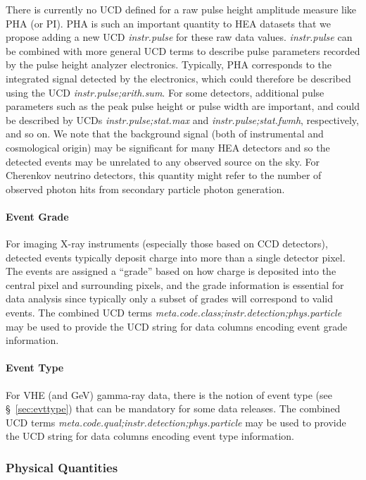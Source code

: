 \documentclass[11pt,a4paper]{ivoa}
\begin{document}
There is currently no UCD defined for a raw pulse height amplitude measure like PHA (or PI). PHA is such an important quantity to \gls{HEA} datasets that we propose adding a new UCD {\em instr.pulse\/} for these raw data values. {\em instr.pulse\/} can be combined with more general UCD terms to describe pulse parameters recorded by the pulse height analyzer electronics. Typically, PHA corresponds to the integrated signal detected by the electronics, which could therefore be described using the UCD {\em instr.pulse;arith.sum}. For some detectors, additional pulse parameters such as the peak pulse height or pulse width are important, and could be described by UCDs {\em instr.pulse;stat.max} and {\em instr.pulse;stat.fwmh}, respectively, and so on. We note that the background signal (both of instrumental and cosmological origin) may be significant for many \gls{HEA} detectors and so the detected events may be unrelated to any observed source on the sky. For Cherenkov neutrino detectors, this quantity might refer to the number of observed photon hits from secondary particle photon generation.

\paragraph{Event Grade}

For imaging X-ray instruments (especially those based on CCD detectors), detected events typically deposit charge into more than a single detector pixel.  The events are assigned a ``grade'' based on how charge is deposited into the central pixel and surrounding pixels, and the grade information is essential for data analysis since typically only a subset of grades will correspond to valid events.  The combined UCD terms {\em meta.code.class;instr.detection;phys.particle\/} may be used to provide the UCD string for data columns encoding event grade information.

\paragraph{Event Type}

For \gls{VHE} (and GeV) gamma-ray data, there is the notion of event type (see \S~\ref{sec:evttype}) that can be mandatory for some data releases.  The combined UCD terms {\em meta.code.qual;instr.detection;phys\-.particle\/} may be used to provide the UCD string for data columns encoding event type information.

\subsubsection{Physical Quantities}
\end{document}
